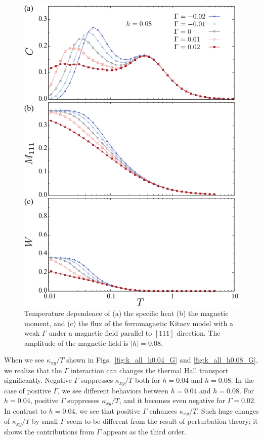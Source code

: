 \documentclass[reprint,amsmath,amssymb,aps,prx]{revtex4-2}
\begin{document}
\begin{figure}
  \begin{center}
    \includegraphics[width=0.9\linewidth]{Figs/plot_CMF_h0.08_G.pdf}
  \end{center}
  \caption{Temperature dependence of (a) the specific heat (b) the magnetic moment, and (c) the flux of the ferromagnetic Kitaev model with a weak $\Gamma$ under a magnetic field parallel to $[111]$ direction. The amplitude of the magnetic field is $|h|=0.08$.}
  \label{fig:CMF_h0.08_G}
\end{figure}

When we see $\kappa_{xy}/T$ shown in Figs.~\ref{fig:k_all_h0.04_G} and \ref{fig:k_all_h0.08_G}, we realize that the $\Gamma$ interaction can changes the thermal Hall transport significantly. Negative $\Gamma$ suppresses $\kappa_{xy}/T$ both for $h = 0.04$ and $h=0.08$. In the case of positive $\Gamma$, we see different behaviors between $h = 0.04$ and $h=0.08$. For $h=0.04$, positive $\Gamma$ suppresses $\kappa_{xy}/T$, and it becomes even negative for $\Gamma = 0.02$. In contrast to $h=0.04$, we see that positive $\Gamma$ enhances $\kappa_{xy}/T$. Such huge changes of $\kappa_{xy}/T$ by small $\Gamma$ seem to be different from the result of perturbation theory; it shows the contributions from $\Gamma$ appears as the third order\cite{YamadaF2021}. 
\end{document}
